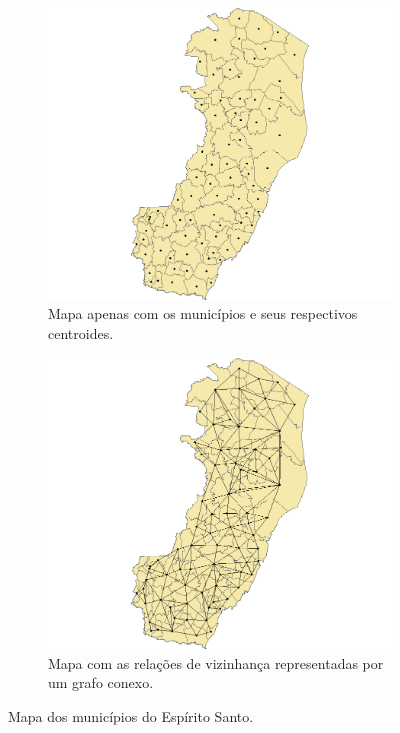 \begin{figure}[h]
\centering
\begin{subfigure}{.5\textwidth}
  \centering
  \includegraphics[width=\linewidth]{images/ES_map.png}
  \caption{Mapa apenas com os municípios e seus respectivos centroides.}
  \label{fig:ES}
\end{subfigure}%
\begin{subfigure}{.5\textwidth}
  \centering
  \includegraphics[width=\linewidth]{images/ES_map_conectedgraph.png}
  \caption{Mapa com as relações de vizinhança representadas por um grafo conexo.}
  \label{fig:ES_conexo}
\end{subfigure}
\caption{Mapa dos municípios do Espírito Santo.}
\label{fig:ES_mapas}
\end{figure}

